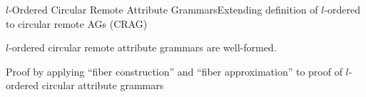 

\begin{frame}{$l$-Ordered Circular Remote Attribute Grammars}{Extending definition of $l$-ordered to circular remote AGs (CRAG)}
    
    \begin{lemma}\label{crag-lordered-wellformed}
$l$-ordered circular remote attribute grammars are well-formed.
\end{lemma}
\newlinevspace
    Proof by applying \enquote{fiber construction} and \enquote{fiber approximation} to proof of $l$-ordered circular attribute grammars
    
\end{frame}

